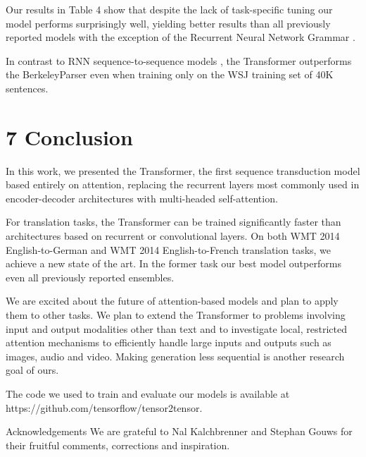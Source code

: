 \documentclass[conference]{IEEEtran}
\begin{document}
Our results in Table 4 show that despite the lack of task-specific tuning our model performs surprisingly well, yielding better results than all previously reported models with the exception of the Recurrent Neural Network Grammar \cite{ref8}.

In contrast to RNN sequence-to-sequence models \cite{ref37}, the Transformer outperforms the BerkeleyParser \cite{ref29} even when training only on the WSJ training set of 40K sentences.

\section{7 Conclusion}

In this work, we presented the Transformer, the first sequence transduction model based entirely on attention, replacing the recurrent layers most commonly used in encoder-decoder architectures with multi-headed self-attention.

For translation tasks, the Transformer can be trained significantly faster than architectures based on recurrent or convolutional layers. On both WMT 2014 English-to-German and WMT 2014 English-to-French translation tasks, we achieve a new state of the art. In the former task our best model outperforms even all previously reported ensembles.

We are excited about the future of attention-based models and plan to apply them to other tasks. We plan to extend the Transformer to problems involving input and output modalities other than text and to investigate local, restricted attention mechanisms to efficiently handle large inputs and outputs such as images, audio and video. Making generation less sequential is another research goal of ours.

The code we used to train and evaluate our models is available at https://github.com/tensorflow/tensor2tensor.

Acknowledgements We are grateful to Nal Kalchbrenner and Stephan Gouws for their fruitful comments, corrections and inspiration.
\end{document}
